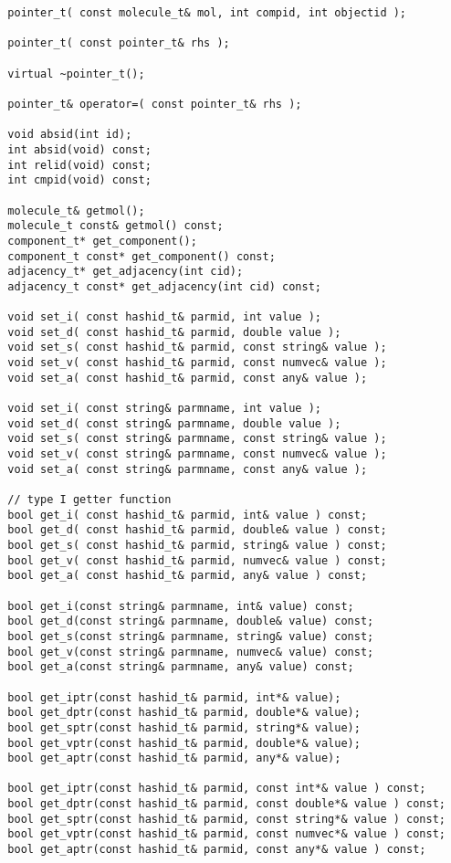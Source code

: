 \documentclass[letterpaper]{book}
\begin{document}
\begin{lstlisting}
  pointer_t( const molecule_t& mol, int compid, int objectid );

  pointer_t( const pointer_t& rhs ); 

  virtual ~pointer_t();

  pointer_t& operator=( const pointer_t& rhs );
   
  void absid(int id);
  int absid(void) const;
  int relid(void) const;
  int cmpid(void) const;

  molecule_t& getmol();
  molecule_t const& getmol() const;
  component_t* get_component(); 
  component_t const* get_component() const;
  adjacency_t* get_adjacency(int cid); 
  adjacency_t const* get_adjacency(int cid) const;

  void set_i( const hashid_t& parmid, int value );
  void set_d( const hashid_t& parmid, double value );
  void set_s( const hashid_t& parmid, const string& value );
  void set_v( const hashid_t& parmid, const numvec& value );
  void set_a( const hashid_t& parmid, const any& value );

  void set_i( const string& parmname, int value );
  void set_d( const string& parmname, double value );
  void set_s( const string& parmname, const string& value );
  void set_v( const string& parmname, const numvec& value );
  void set_a( const string& parmname, const any& value );
  
  // type I getter function
  bool get_i( const hashid_t& parmid, int& value ) const; 
  bool get_d( const hashid_t& parmid, double& value ) const;
  bool get_s( const hashid_t& parmid, string& value ) const;
  bool get_v( const hashid_t& parmid, numvec& value ) const;
  bool get_a( const hashid_t& parmid, any& value ) const;

  bool get_i(const string& parmname, int& value) const;
  bool get_d(const string& parmname, double& value) const;
  bool get_s(const string& parmname, string& value) const;
  bool get_v(const string& parmname, numvec& value) const;
  bool get_a(const string& parmname, any& value) const;

  bool get_iptr(const hashid_t& parmid, int*& value); 
  bool get_dptr(const hashid_t& parmid, double*& value);
  bool get_sptr(const hashid_t& parmid, string*& value);
  bool get_vptr(const hashid_t& parmid, double*& value);
  bool get_aptr(const hashid_t& parmid, any*& value);

  bool get_iptr(const hashid_t& parmid, const int*& value ) const; 
  bool get_dptr(const hashid_t& parmid, const double*& value ) const;
  bool get_sptr(const hashid_t& parmid, const string*& value ) const;
  bool get_vptr(const hashid_t& parmid, const numvec*& value ) const;
  bool get_aptr(const hashid_t& parmid, const any*& value ) const;


\end{lstlisting}
\end{document}
